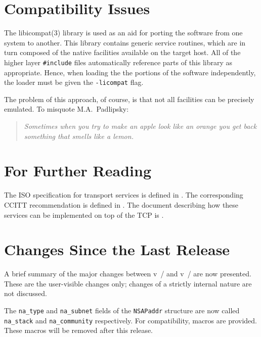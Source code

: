 \section	{Compatibility Issues}
The \man libicompat(3) library is used as an aid for porting the software from
one system to another.
This library contains generic service routines,
which are in turn composed of the native facilities available on the target
host.
All of the higher layer \verb"#include" files automatically reference parts
of this library as appropriate.
Hence, when loading the the portions of the software independently,
the loader must be given the \verb"-licompat" flag.

The problem of this approach, of course, is that not all facilities can be
precisely emulated.
To misquote M.A.~Padlipsky\cite{Gateways.Heffalumps}:
\begin{quote}\em
Sometimes when you try to make an apple look like an orange you get back
something that smells like a lemon.
\end{quote}

\section	{For Further Reading}
The ISO specification for transport services is defined in
\cite{ISO.TP.Service}.
The corresponding CCITT recommendation is defined in \cite{CCITT.TP.Service}.
The document describing how these services can be implemented on top of the
TCP\cite{TCP} is \cite{TSAP.on.TCP}.

\section	{Changes Since the Last Release}\label{tsap:changes}
A brief summary of the major changes between v~\isodeprevrsn/ and
v~\isodevrsn/ are now presented.
These are the user-visible changes only;
changes of a strictly internal nature are not discussed.

The \verb"na_type" and \verb"na_subnet" fields of the \verb"NSAPaddr"
structure are now called \verb"na_stack" and \verb"na_community" respectively.
For compatibility,
macros are provided.
These macros will be removed after this release.
